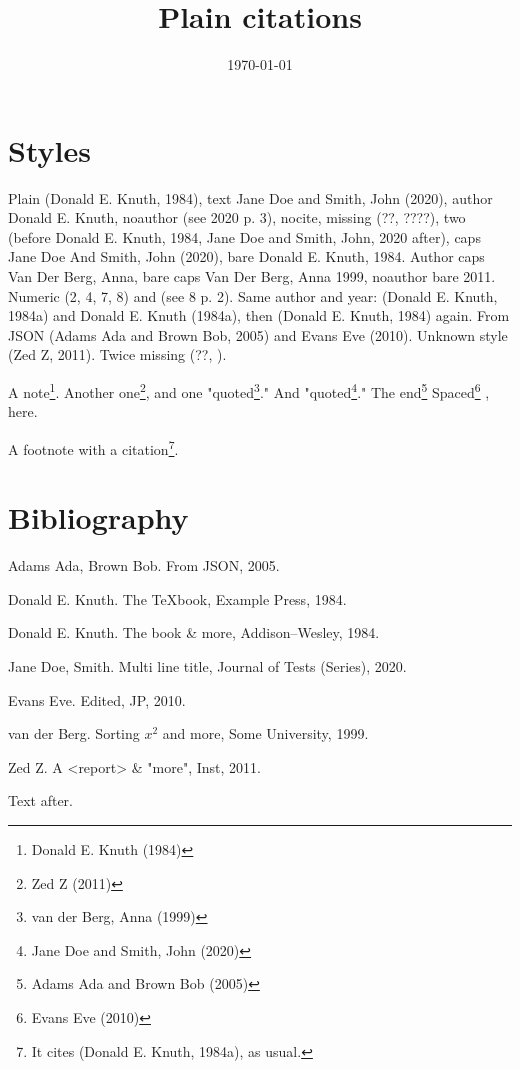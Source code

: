 \documentclass[11pt]{article}
\date{\today}
\title{Plain citations}
\begin{document}
\maketitle
\tableofcontents

\section{Styles}
\label{sec:org3028fdc}
Plain (Donald E. Knuth, 1984), text Jane Doe and Smith, John (2020), author Donald E. Knuth,
noauthor (see 2020 p. 3), nocite, missing (??, ????),
two (before Donald E. Knuth, 1984,  Jane Doe and Smith, John, 2020 after), caps Jane Doe And Smith, John (2020), bare Donald E. Knuth, 1984.
Author caps Van Der Berg, Anna, bare caps Van Der Berg, Anna 1999, noauthor bare 2011.
Numeric (2, 4, 7, 8) and (see 8 p. 2).
Same author and year: (Donald E. Knuth, 1984a) and Donald E. Knuth (1984a), then (Donald E. Knuth, 1984) again.
From JSON (Adams Ada and Brown Bob, 2005) and Evans Eve (2010).
Unknown style (Zed Z, 2011).  Twice missing (??, ).

A note\footnote{Donald E. Knuth (1984)}. Another one\footnote{Zed Z (2011)}, and one "quoted\footnote{van der Berg, Anna (1999)}."
And "quoted\footnote{Jane Doe and Smith, John (2020)}." The end\footnote{Adams Ada and Brown Bob (2005)}
Spaced\footnote{Evans Eve (2010)} , here.

A footnote with a citation\footnote{It cites (Donald E. Knuth, 1984a), as usual.}.
\section{Bibliography}
\label{sec:org0af2b60}
\noindent
Adams Ada, Brown Bob. From JSON, 2005.

\noindent
Donald E. Knuth. The {\TeX}book, Example Press, 1984.

\noindent
Donald E. Knuth. The \METAFONT book \& more, Addison--Wesley, 1984.

\noindent
Jane Doe, Smith. Multi line title, Journal of Tests (Series), 2020.

\noindent
Evans Eve. Edited, JP, 2010.

\noindent
van der Berg. Sorting $x^2$ and \alpha{} more, Some University, 1999.

\noindent
Zed Z. A <report> & "more", Inst, 2011.

Text after.
\end{document}
